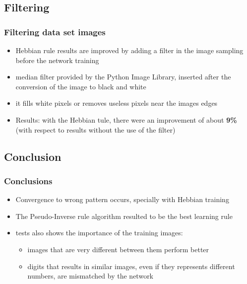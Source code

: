 \documentclass{beamer}
\begin{document}

\subsection{Filtering}
\begin{frame}
\frametitle{Filtering data set images}
\begin{itemize}
\item Hebbian rule results are improved by adding a filter in the image sampling before the network training
\item median filter provided by the Python Image Library, inserted after the conversion of the image to black and white 
\item it fills white pixels or removes useless pixels near the images edges
\item Results: with the Hebbian tule, there were an improvement of about \textbf{9\%} (with respect to results without the use of the filter)
\end{itemize}
\end{frame}


\subsection{Conclusion}
\begin{frame}
\frametitle{Conclusions}
\begin{itemize}
\item Convergence to wrong pattern occurs, specially with Hebbian training
\item The Pseudo-Inverse rule algorithm resulted to be the best learning rule
\item tests also shows the importance of the training images: 
\begin{itemize}
\item images that are very different between them perform better
\item digits that results in similar images, even if they represents different numbers, are mismatched by the network
\end{itemize}
\end{itemize}
\end{frame}

\end{document}
